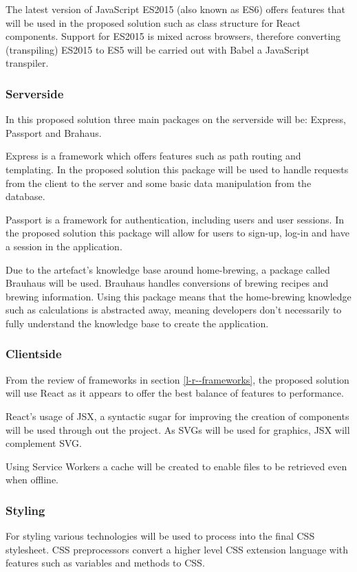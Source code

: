 The latest version of JavaScript ES2015 (also known as ES6) offers features that will be used in the proposed solution such as class structure for React components. Support for ES2015 is mixed across browsers, therefore converting (transpiling) ES2015 to ES5 will be carried out with Babel a JavaScript transpiler. \cite{babel}

\subsubsection{Serverside} \label{a-d--t--serverside}

In this proposed solution three main packages on the serverside will be: Express, Passport and Brahaus. \cite{npm}

Express is a framework which offers features such as path routing and templating. In the proposed solution this package will be used to handle requests from the client to the server and some basic data manipulation from the database. \cite{express}

Passport is a framework for authentication, including users and user sessions. In the proposed solution this package will allow for users to sign-up, log-in and have a session in the application. \cite{passport}

Due to the artefact's knowledge base around home-brewing, a package called Brauhaus will be used. Brauhaus handles conversions of brewing recipes and brewing information. Using this package means that the home-brewing knowledge such as calculations is abstracted away, meaning developers don't necessarily to fully understand the knowledge base to create the application. \cite{brauhaus.js}

\subsubsection{Clientside} \label{a-d--t--clientside}

From the review of frameworks in section \ref{l-r--frameworks}, the proposed solution will use React as it appears to offer the best balance of features to performance.

React's usage of JSX, a syntactic sugar for improving the creation of components will be used through out the project. As SVGs will be used for graphics, JSX will complement SVG. \cite{jsx}

Using Service Workers a cache will be created to enable files to be retrieved even when offline.

\subsubsection{Styling} \label{a-d--t--styling}
For styling various technologies will be used to process into the final CSS stylesheet. CSS preprocessors convert a higher level CSS extension language with features such as variables and methods to CSS.

